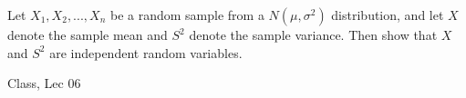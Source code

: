 \begin{samepage}
\begin{ex}
Let $X_1, X_2, . . . , X_n$ be a random sample from a $N(\mu, \sigma^2)$ distribution, and let $X$ denote the sample mean and $S^2$ denote the sample variance. Then show that $X$ and $S^2$ are independent random variables.
\end{ex}
\begin{source}
Class, Lec 06
\end{source}
\end{samepage}
